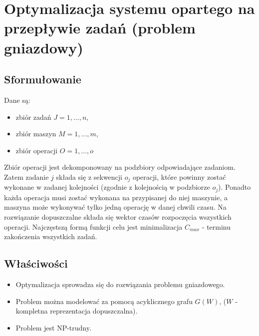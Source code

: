 \section{Optymalizacja systemu opartego na przepływie zadań (problem gniazdowy)}
	\subsection{Sformułowanie}
		Dane są:
		\begin{itemize}
			\item zbiór zadań $J={1, ..., n}$,
			\item zbiór maszyn $M={1, ..., m}$,
			\item zbiór operacji $O={1, ..., o}$
		\end{itemize}				
		Zbiór operacji jest dekomponowany na podzbiory odpowiadające zadaniom. Zatem zadanie $j$ składa się 
		z sekwencji $o_j$ operacji, które powinny zostać wykonane w zadanej kolejności (zgodnie z kolejnością w podzbiorze 
		$o_j$). Ponadto każda operacja musi zostać wykonana na przypisanej do niej maszynie, a maszyna może wykonywać
		tylko jedną operację w danej chwili czasu. \newline
		Na rozwiązanie dopuszczalne składa się wektor czasów rozpoczęcia wszystkich operacji. Najczęstszą formą funkcji celu
		jest minimalizacja $C_{max}$ - terminu zakończenia wszystkich zadań.
		
	\subsection{Właściwości}
		\begin{itemize}
		\item Optymalizacja sprowadza się do rozwiązania problemu gniazdowego.
			\item Problem można modelować za pomocą acyklicznego grafu $G(W)$, ($W$ - kompletna reprezentacja dopuszczalna).
			\item Problem jest NP-trudny.
		\end{itemize}			
	
